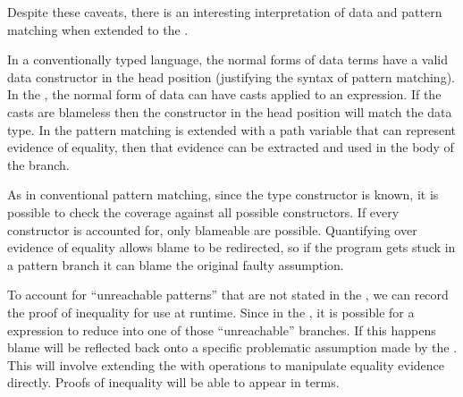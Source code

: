 Despite these caveats, there is an interesting interpretation of data and pattern matching when extended to the \csys{}.

In a conventionally typed language, the normal forms of data terms have a valid data constructor in the head position (justifying the syntax of pattern matching).
In the \clang{}, the normal form of data can have casts applied to an expression.
If the casts are blameless then the constructor in the head position will match the data type.
In the \clang{} pattern matching is extended with a path variable that can represent evidence of equality, then that evidence can be extracted and used in the body of the branch.

As in conventional pattern matching, since the type constructor is known, it is possible to check the coverage against all possible constructors.
If every constructor is accounted for, only blameable \scruts{} are possible.
Quantifying over evidence of equality allows blame to be redirected, so if the program gets stuck in a pattern branch it can blame the original faulty assumption.

To account for ``unreachable patterns'' that are not stated in the \slang, we can record the proof of inequality for use at runtime.
Since in the \clang{}, it is possible for a \case{} expression to reduce into one of those ``unreachable'' branches.
If this happens blame will be reflected back onto a specific problematic assumption made by the \scrut{}.
This will involve extending the \clang{} with operations to manipulate equality evidence directly.
Proofs of inequality will be able to appear in terms.
 









% 


